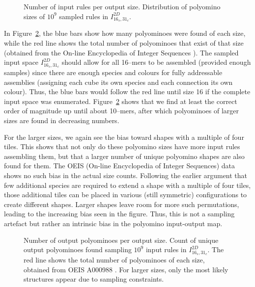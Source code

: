 \begin{figure}[h]
    \centering
    \caption{Number of input rules per output size. Distribution of polyomino sizes of \(10^9\) sampled rules in \(I_{16_s,31_c}^{2D}\).
    }
    \label{fig:ref_inputdistr}
\end{figure}

In Figure~\ref{fig:ref_outputdistr}, the blue bars show how many polyominoes were found of each size, while the red line shows the total number of polyominoes that exist of that size (obtained from the On-line Encyclopedia of Integer Sequences \cite{sloane1995encyclopedia, oeisA000988}). The sampled input space \(I_{16_s,31_c}^{2D}\) should allow for all 16--mers to be assembled (provided enough samples) since there are enough species and colours for fully addressable assemblies (assigning each cube its own species and each connection its own colour). Thus, the blue bars would follow the red line until size 16 if the complete input space was enumerated. Figure~\ref{fig:ref_outputdistr} shows that we find at least the correct order of magnitude up until about 10--mers, after which polyominoes of larger sizes are found in decreasing numbers.


For the larger sizes, we again see the bias toward shapes with a multiple of four tiles. This shows that not only do these polyomino sizes have more input rules assembling them, but that a larger number of unique polyomino shapes are also found for them. The OEIS (On-line Encyclopedia of Integer Sequences) data shows no such bias in the actual size counts. Following the earlier argument that few additional species are required to extend a shape with a multiple of four tiles, those additional tiles can be placed in various (still symmetric) configurations to create different shapes. Larger shapes leave room for more such permutations, leading to the increasing bias seen in the figure. Thus, this is not a sampling artefact but rather an intrinsic bias in the polyomino input-output map. 

\begin{figure}[h]
    \centering
    \caption{Number of output polyominoes per output size. Count of unique output polyominoes found sampling \(10^9\) input rules in \(I_{16_s,31_c}^{2D}\). The red line shows the total number of polyominoes of each size, obtained from OEIS A000988 \cite{sloane1995encyclopedia, oeisA000988}. For larger sizes, only the most likely structures appear due to sampling constraints.
    }
    \label{fig:ref_outputdistr}
\end{figure}

